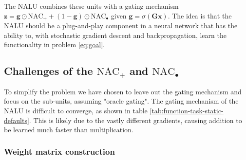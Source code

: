 The NALU combines these units with a gating mechanism $\mathbf{z} = \mathbf{g} \odot \text{NAC}_{+} + (1 - \mathbf{g}) \odot \text{NAC}_{\bullet}$ given $\mathbf{g} = \sigma(\mathbf{G} \mathbf{x})$. The idea is that the NALU should be a plug-and-play component in a neural network that has the ability to, with stochastic gradient descent and backpropagation, learn the functionality in problem \ref{eq:goal}.

\subsection{Challenges of the $\text{NAC}_{+}$ and $\text{NAC}_{\bullet}$}
To simplify the problem we have chosen to leave out the gating mechanism and focus on the sub-units, assuming "oracle gating". The gating mechanism of the NALU is difficult to converge, as shown in table \ref{tab:function-task-static-defaults}. This is likely due to the vastly different gradients, causing addition to be learned much faster than multiplication.





\subsubsection{Weight matrix construction}\label{sssec:weight}

